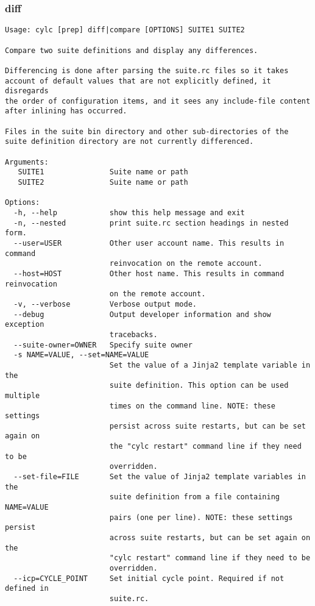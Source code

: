 \subsubsection{diff}
\label{diff}
\begin{lstlisting}
Usage: cylc [prep] diff|compare [OPTIONS] SUITE1 SUITE2

Compare two suite definitions and display any differences.

Differencing is done after parsing the suite.rc files so it takes
account of default values that are not explicitly defined, it disregards
the order of configuration items, and it sees any include-file content
after inlining has occurred.

Files in the suite bin directory and other sub-directories of the
suite definition directory are not currently differenced.

Arguments:
   SUITE1               Suite name or path
   SUITE2               Suite name or path

Options:
  -h, --help            show this help message and exit
  -n, --nested          print suite.rc section headings in nested form.
  --user=USER           Other user account name. This results in command
                        reinvocation on the remote account.
  --host=HOST           Other host name. This results in command reinvocation
                        on the remote account.
  -v, --verbose         Verbose output mode.
  --debug               Output developer information and show exception
                        tracebacks.
  --suite-owner=OWNER   Specify suite owner
  -s NAME=VALUE, --set=NAME=VALUE
                        Set the value of a Jinja2 template variable in the
                        suite definition. This option can be used multiple
                        times on the command line. NOTE: these settings
                        persist across suite restarts, but can be set again on
                        the "cylc restart" command line if they need to be
                        overridden.
  --set-file=FILE       Set the value of Jinja2 template variables in the
                        suite definition from a file containing NAME=VALUE
                        pairs (one per line). NOTE: these settings persist
                        across suite restarts, but can be set again on the
                        "cylc restart" command line if they need to be
                        overridden.
  --icp=CYCLE_POINT     Set initial cycle point. Required if not defined in
                        suite.rc.
\end{lstlisting}
